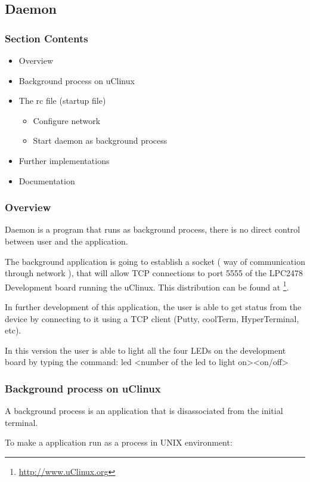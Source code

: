 \subsection{Daemon}
\subsubsection{Section Contents}
\begin{itemize}
	\item Overview
	\item Background process on uClinux
	\item The rc file (startup file)
	\begin{itemize}
		\item Configure network
		\item Start daemon as background process
	\end{itemize}
	\item Further implementations
	\item Documentation
\end{itemize}

\subsubsection{Overview}
Daemon is a program that runs as background process, there is no direct control between user and the application.

The background application is going to establish a socket ( way of communication through network ), that will allow TCP connections to port 5555 of the LPC2478 Development board running the uClinux. This distribution can be found at \footnote{\url{http://www.uClinux.org}}.

In further development of this application, the user is able to get status from the device by connecting to it using a TCP client (Putty, coolTerm, HyperTerminal, etc).

In this version the user is able to light all the four LEDs on the development board by typing the command: led \textless number of the led to light on\textgreater  \textless on/off\textgreater

\subsubsection{Background process on uClinux}
A background process is an application that is disassociated from the initial terminal. 

To make a application run as a process in UNIX environment:

